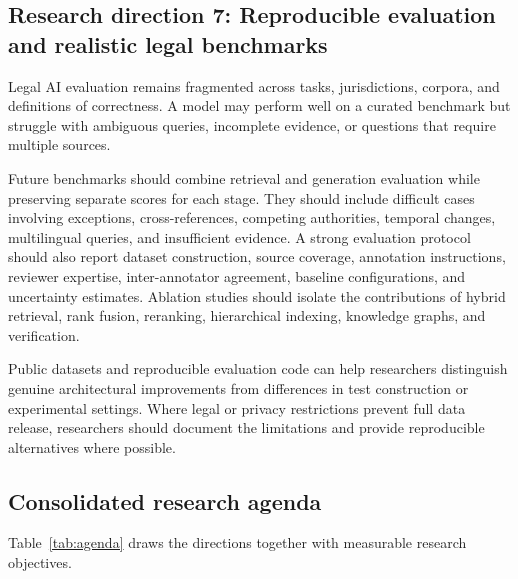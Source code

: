 \subsection{Research direction 7: Reproducible evaluation and realistic legal benchmarks}

Legal AI evaluation remains fragmented across tasks, jurisdictions, corpora, and definitions of
correctness. A model may perform well on a curated benchmark but struggle with ambiguous queries,
incomplete evidence, or questions that require multiple sources.

Future benchmarks should combine retrieval and generation evaluation while preserving separate scores for
each stage. They should include difficult cases involving exceptions, cross-references, competing
authorities, temporal changes, multilingual queries, and insufficient evidence. A strong evaluation
protocol should also report dataset construction, source coverage, annotation instructions, reviewer
expertise, inter-annotator agreement, baseline configurations, and uncertainty estimates. Ablation studies
should isolate the contributions of hybrid retrieval, rank fusion, reranking, hierarchical indexing,
knowledge graphs, and verification.

Public datasets and reproducible evaluation code can help researchers distinguish genuine architectural
improvements from differences in test construction or experimental settings. Where legal or privacy
restrictions prevent full data release, researchers should document the limitations and provide
reproducible alternatives where possible.

\subsection{Consolidated research agenda}

Table~\ref{tab:agenda} draws the directions together with measurable research objectives.

